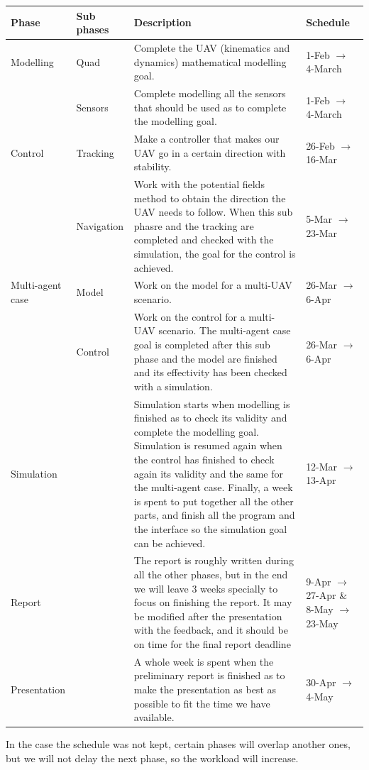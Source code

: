 \documentclass{article}
\begin{document}
		\begin{center}
			\bigskip
			\begin{tabular}{|C{2cm}|C{2cm}|C{7cm}|C{3cm}|}
				Phase & Sub phases & Description & Schedule\\ \hline
				Modelling & Quad & Complete the UAV (kinematics and dynamics) mathematical modelling goal. &  1-Feb $\rightarrow$ 4-March  \\ 
				& Sensors & Complete modelling all the sensors that should be used as to complete the modelling goal. & 1-Feb $\rightarrow$ 4-March \\ \hline
				
				Control & Tracking & Make a controller that makes our UAV go in a certain direction with stability. &  26-Feb $\rightarrow$ 16-Mar\\ 
				&Navigation & Work with the potential fields method to obtain the direction the UAV needs to follow. When this sub phasre and the tracking are completed and checked with the simulation, the goal for the control is achieved. & 5-Mar $\rightarrow$ 23-Mar \\ \hline
				
				Multi-agent case & Model & Work on the model for a multi-UAV scenario. & 26-Mar $\rightarrow$ 6-Apr\\ 
				&Control & Work on the control for a multi-UAV scenario. The multi-agent case goal is completed after this sub phase and the model are finished and its effectivity has been checked with a simulation. & 26-Mar $\rightarrow$ 6-Apr \\ \hline
				
				Simulation & & Simulation starts when modelling is finished as to check its validity and complete the modelling goal. Simulation is resumed again when the control has finished to check again its validity and the same for the multi-agent case. Finally, a week is spent to put together all the other parts, and finish all the program and the interface so the simulation goal can be achieved. & 12-Mar $\rightarrow$ 13-Apr \\ \hline
				
				Report & & The report is roughly written during all the other phases, but in the end we will leave 3  weeks specially to focus on finishing the report. It may be modified after the presentation with the feedback, and it should be on time for the final report deadline & 9-Apr $\rightarrow$ 27-Apr \& 8-May $\rightarrow$ 23-May \\ \hline
				
				Presentation & & A whole week is spent when the preliminary report is finished as to make the presentation as best as possible to fit the time we have available. & 30-Apr $\rightarrow$ 4-May \\ \hline
			\end{tabular}
		\end{center}
			\bigskip
			In the case the schedule was not kept, certain phases will overlap another ones, but we will not delay the next phase, so the workload will increase. 
			
\end{document}
